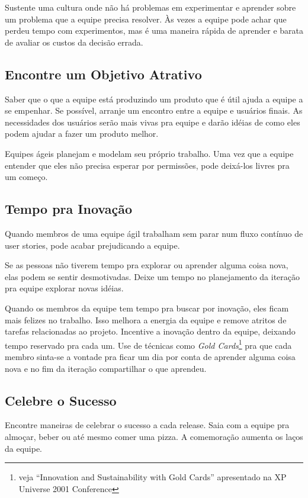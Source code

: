 \documentclass[a4paper, 10pt, font=plain]{abnt}
\begin{document}
Sustente uma cultura onde não há problemas em experimentar e aprender sobre um problema que a equipe precisa resolver. Às vezes a equipe pode achar que perdeu tempo com experimentos, mas é uma maneira rápida de aprender e barata de avaliar os custos da decisão errada.


\subsection{Encontre um Objetivo Atrativo}
Saber que o que a equipe está produzindo um produto que é útil ajuda a equipe a se empenhar. Se possível, arranje um encontro entre a equipe e usuários finais. As necessidades dos usuários serão mais vivas pra equipe e darão idéias de como eles podem ajudar a fazer um produto melhor.

Equipes ágeis planejam e modelam seu próprio trabalho. Uma vez que a equipe entender que eles não precisa esperar por permissões, pode deixá-los livres pra um começo.


\subsection{Tempo pra Inovação}
Quando membros de uma equipe ágil trabalham sem parar num fluxo contínuo de user stories, pode acabar prejudicando a equipe.

Se as pessoas não tiverem tempo pra explorar ou aprender alguma coisa nova, elas podem se sentir desmotivadas. Deixe um tempo no planejamento da iteração pra equipe explorar novas idéias.

Quando os membros da equipe tem tempo pra buscar por inovação, eles ficam mais felizes no trabalho. Isso melhora a energia da equipe e remove atritos de tarefas relacionadas ao projeto. Incentive a inovação dentro da equipe, deixando tempo reservado pra cada um. Use de técnicas como \textit{Gold Cards}\footnote{veja ``Innovation and Sustainability with Gold Cards'' apresentado na XP Universe 2001 Conference} pra que cada membro sinta-se a vontade pra ficar um dia por conta de aprender alguma coisa nova e no fim da iteração compartilhar o que aprendeu.


\subsection{Celebre o Sucesso}
Encontre maneiras de celebrar o sucesso a cada release. Saia com a equipe pra almoçar, beber ou até mesmo comer uma pizza. A comemoração aumenta os laços da equipe.
\end{document}
